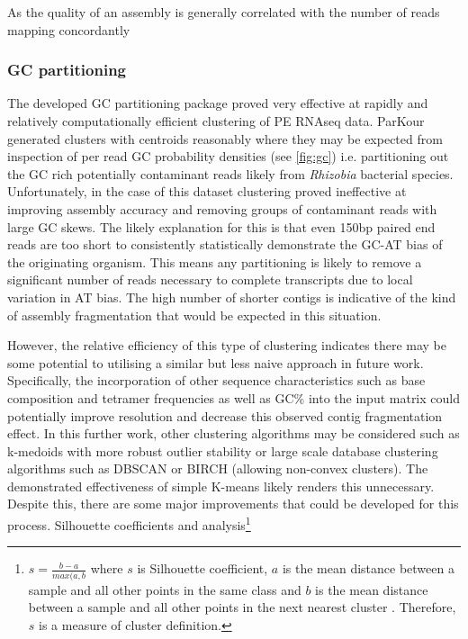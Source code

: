 As the quality of an assembly is generally correlated with the number of reads mapping concordantly
\citep{Macmanes2014} 






\subsubsection{GC partitioning}

The developed GC partitioning package proved very effective at rapidly and relatively computationally 
efficient clustering of PE RNAseq data. ParKour generated clusters with centroids
reasonably where they may be expected from inspection of per read GC probability densities (see \ref{fig:gc})
i.e. partitioning out the GC rich potentially contaminant reads likely from \textit{Rhizobia}
bacterial species.  Unfortunately, in the case of this dataset clustering proved ineffective
at improving assembly accuracy and removing groups of contaminant reads with large GC skews. 
The likely explanation for this is that even 150bp paired end reads are too short to consistently
statistically demonstrate the GC-AT bias of the originating organism. This means any partitioning
is likely to remove a significant number of reads necessary to complete transcripts due to local
variation in AT bias.  The high number of shorter contigs is indicative of the kind of assembly
fragmentation that would be expected in this situation.


However, the relative efficiency of this type of clustering indicates there may be
some potential to utilising a similar but less naive approach in future work.  Specifically,
the incorporation of other sequence characteristics such as base composition and 
tetramer frequencies as well as GC\% into the input matrix could potentially 
improve resolution and decrease this observed contig fragmentation effect. 
In this further work, other clustering algorithms may be considered
such as k-medoids \citep{Kaufman1987} with more robust outlier stability or large scale
database clustering algorithms such as DBSCAN \citep{Ester1996} or BIRCH \citep{Zhang1996} (allowing non-convex
clusters).
The demonstrated effectiveness of simple K-means likely renders this unnecessary.
Despite this, there are some major improvements that could be developed for this process.
Silhouette coefficients and analysis\footnote{
    \(s = \frac{b -a}{max(a,b}\) where \(s\) is Silhouette coefficient, \(a\) is the mean distance
        between a sample and all other points in the same class and \(b\) is the mean distance
    between a sample and all other points in the next nearest cluster \citep{scikit-learn}.  Therefore,
\(s\) is a measure of cluster definition.}

